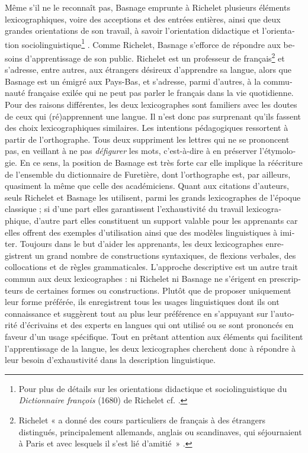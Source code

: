 \documentclass[output=paper,colorlinks,citecolor=brown,arabicfont,chinesefont,booklanguage=french]{langscibook}
\begin{document}
\begin{otherlanguage}{french}
Même s’il ne le reconnaît pas, Basnage emprunte à Richelet plusieurs éléments lexicographiques, voire des acceptions et des entrées entières, ainsi que deux grandes orientations de son travail, à savoir l’orientation didactique et l’orientation sociolinguistique\footnote{Pour plus de détails sur les orientations didactique et sociolinguistique du \emph{Dictionnaire françois} (1680) de Richelet cf. \citealt[7]{Quemada2004}.} . Comme Richelet, Basnage s’efforce de répondre aux besoins d'apprentissage de son public. Richelet est un professeur de français\footnote{Richelet « a donné des cours particuliers de français à des étrangers distingués, principalement allemands, anglais ou scandinaves, qui séjournaient à Paris et avec lesquels il s’est lié d’amitié~» \citep[2]{Quemada2004}.}  et s'adresse, entre autres, aux étrangers désireux d'apprendre sa langue, alors que Basnage est un émigré aux Pays-Bas, et s'adresse, parmi d’autres, à la communauté française exilée qui ne peut pas parler le français dans la vie quotidienne. Pour des raisons différentes, les deux lexicographes sont familiers avec les doutes de ceux qui (ré)apprennent une langue. Il n'est donc pas surprenant qu'ils fassent des choix lexicographiques similaires. Les intentions pédagogiques ressortent à partir de l’orthographe. Tous deux suppriment les lettres qui ne se prononcent pas, en veillant à ne pas \emph{défigurer} les mots, c'est-à-dire à en préserver l'étymologie. En ce sens, la position de Basnage est très forte car elle implique la réécriture de l'ensemble du dictionnaire de Furetière, dont l'orthographe est, par ailleurs, quasiment la même que celle des académiciens. Quant aux citations d'auteurs, seuls Richelet et Basnage les utilisent, parmi les grands lexicographes de l'époque classique ; si d'une part elles garantissent l’exhaustivité du travail lexicographique, d'autre part elles constituent un support valable pour les apprenants car elles offrent des exemples d'utilisation ainsi que des modèles linguistiques à imiter. Toujours dans le but d'aider les apprenants, les deux lexicographes enregistrent un grand nombre de constructions syntaxiques, de flexions verbales, des collocations et de règles grammaticales. L'approche descriptive est un autre trait commun aux deux lexicographes : ni Richelet ni Basnage ne s'érigent en prescripteurs de certaines formes ou constructions. Plutôt que de proposer uniquement leur forme préférée, ils enregistrent tous les usages linguistiques dont ils ont connaissance et suggèrent tout au plus leur préférence en s'appuyant sur l'autorité d'écrivains et des experts en langues qui ont utilisé ou se sont prononcés en faveur d'un usage spécifique. Tout en prêtant attention aux éléments qui facilitent l'apprentissage de la langue, les deux lexicographes cherchent donc à répondre à leur besoin d'exhaustivité dans la description linguistique.


\end{otherlanguage}
\end{document}
